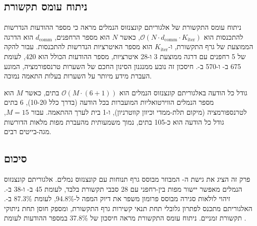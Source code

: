 \subsection{ניתוח עומס תקשורת}
\label{sec:ch04_comm_overhead}

ניתוח עומס התקשורת של אלגוריתם קונצנזוס הנמלים מראה כי מספר ההודעות הנדרשות להתכנסות הוא $\mathcal{O}(N \cdot d_{\text{comm}} \cdot K_{\text{iter}})$, כאשר $N$ הוא מספר הרחפנים, $d_{\text{comm}}$ הוא הדרגה הממוצעת של גרף התקשורת, ו-$K_{\text{iter}}$ הוא מספר האיטרציות הנדרשות להתכנסות. עבור להקה של 5 רחפנים עם דרגה ממוצעת 3 ו-28 איטרציות, מספר ההודעות הכולל הוא 420, לעומת 675 ב- ו-570 ב-. חיסכון זה נובע ממנגנון הסינון החכם של השערות טרנספורמציה, המונע העברת מידע מיותר על השערות בעלות התאמה נמוכה.

גודל כל הודעה באלגוריתם קונצנזוס הנמלים הוא $\mathcal{O}(M \cdot (6 + 1))$ בתים, כאשר $M$ הוא מספר הנמלים הווירטואליות המועברות בכל הודעה (בדרך כלל 10-20), 6 בתים לטרנספורמציה (מיקום תלת-ממדי וכיוון קווטרניון), ו-1 בית לערך ההתאמה. עבור $M = 15$, גודל כל הודעה הוא כ-105 בתים, נמוך משמעותית מהעברת מפות מלאות הדורשות מגה-בייטים רבים.

\subsection{סיכום}
\label{sec:ch04_summary}

פרק זה הציג את גישת ה- המבוזר מבוסס גרף תנוחות עם קונצנזוס נמלים. אלגוריתם קונצנזוס הנמלים מאפשר יישור מפות בין-רחפני עם 28 סבבי תקשורת בלבד, לעומת 45 ב- ו-38 ב-. זיהוי לולאות סגירה מבוסס פרומון משפר את דיוק המפה ל-94.8\%, לעומת 87.3\% ב-. האלגוריתם מתכנס לפתרון גלובלי תחת תנאי קשירות גרף התקשורת, ומספק חוסן תחת ניתוקי תקשורת זמניים. ניתוח עומס התקשורת מראה חיסכון של 37.8\% במספר ההודעות לעומת .

\cite{Lajoie2023SwarmSLAM, Xu2024D2SLAM, Cieslewski2017Decentralized, Grisetti2010GraphSLAM, Thrun2005Probabilistic}
